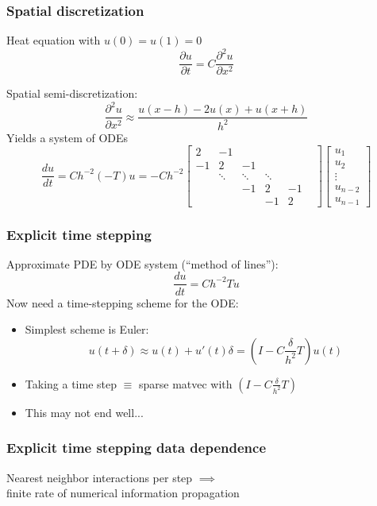 \documentclass{beamer}
\begin{document}
\begin{frame}
  \frametitle{Spatial discretization}

  Heat equation with $u(0) = u(1) = 0$
  \[
  \frac{\partial u}{\partial t} = C \frac{\partial^2 u}{\partial x^2}
  \]

  Spatial semi-discretization:
  \[
  \frac{\partial^2 u}{\partial x^2} \approx \frac{u(x-h)-2u(x)+u(x+h)}{h^2}
  \]
  Yields a system of ODEs
  \[
  \frac{du}{dt} = C h^{-2} (-T) u =
  -C h^{-2}
  \begin{bmatrix}
     2 & -1      &   &    &        & \\
    -1 &  2      & -1 &    &        & \\
       & \ddots  & \ddots & \ddots & \\
       &         & -1      & 2     & -1 \\
       &         &        &  -1     & 2
  \end{bmatrix}
  \begin{bmatrix} u_1 \\ u_2 \\ \vdots \\ u_{n-2} \\ u_{n-1} \end{bmatrix}
  \]
\end{frame}


\begin{frame}
  \frametitle{Explicit time stepping}

  Approximate PDE by ODE system (``method of lines''):
  \[
    \frac{du}{dt} = C h^{-2} T u
  \]
  Now need a time-stepping scheme for the ODE:
  \begin{itemize}
  \item Simplest scheme is Euler:
    \[
      u(t+\delta) \approx u(t) + u'(t) \delta
                  = \left( I - C \frac{\delta}{h^2} T \right) u(t)
    \]
  \item Taking a time step $\equiv$ sparse matvec with
    $\left( I - C \frac{\delta}{h^2} T \right)$
  \item This may not end well...
  \end{itemize}

\end{frame}


\begin{frame}
  \frametitle{Explicit time stepping data dependence}

  \begin{center}
    
  \end{center}
  \begin{center}
    Nearest neighbor interactions per step $\implies$ \\
    finite rate of numerical information propagation
  \end{center}

\end{frame}
\end{document}
